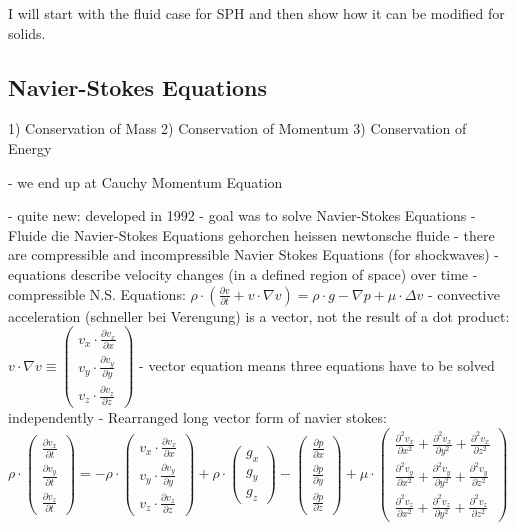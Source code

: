I will start with the fluid case for SPH and then show how it can be modified for solids.

\subsection{Navier-Stokes Equations}
1) Conservation of Mass
2) Conservation of Momentum
3) Conservation of Energy

- we end up at Cauchy Momentum Equation

- quite new: developed in 1992
- goal was to solve Navier-Stokes Equations
- Fluide die Navier-Stokes Equations gehorchen heissen newtonsche fluide
- there are compressible and incompressible Navier Stokes Equations (for shockwaves)
- equations describe velocity changes (in a defined region of space) over time
- compressible N.S. Equations:
$\rho \cdot (\frac{\partial v}{\partial t} + v \cdot \nabla v) = \rho \cdot g - \nabla p + \mu \cdot \Delta v$
- convective acceleration (schneller bei Verengung) is a vector, not the result of a dot product:
$v\cdot \nabla v \equiv \begin{pmatrix} v_x \cdot \frac{\partial v_x}{\partial x} \\ v_y \cdot \frac{\partial v_y}{\partial y} \\ v_z \cdot \frac{\partial v_z}{\partial z}\end{pmatrix}$
- vector equation means three equations have to be solved independently
- Rearranged long vector form of navier stokes:
$ \rho \cdot \begin{pmatrix} \frac{\partial v_x}{\partial t} \\ \frac{\partial v_y}{\partial t} \\ \frac{\partial v_z}{\partial t}\end{pmatrix} =  - \rho \cdot \begin{pmatrix} v_x \cdot \frac{\partial v_x}{\partial x} \\ v_y \cdot \frac{\partial v_y}{\partial y} \\ v_z \cdot \frac{\partial v_z}{\partial z}\end{pmatrix} + \rho \cdot \begin{pmatrix} g_x \\ g_y \\ g_z \end{pmatrix} - \begin{pmatrix} \frac{\partial p}{\partial x} \\ \frac{\partial p}{\partial y} \\ \frac{\partial p}{\partial z}\end{pmatrix} + \mu \cdot \begin{pmatrix}  \frac{\partial^{2} v_x}{\partial x^{2}} + \frac{\partial^{2} v_x}{\partial y^{2}} + \frac{\partial^{2} v_x}{\partial z^{2}} \\ \frac{\partial^{2} v_y}{\partial x^{2}} + \frac{\partial^{2} v_y}{\partial y^{2}} + \frac{\partial^{2} v_y}{\partial z^{2}} \\ \frac{\partial^{2} v_z}{\partial x^{2}} + \frac{\partial^{2} v_z}{\partial y^{2}} + \frac{\partial^{2} v_z}{\partial z^{2}} \end{pmatrix} $
